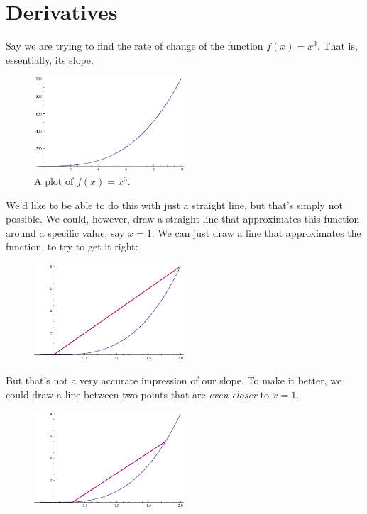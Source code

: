 \chapter{Derivatives}\label{ch:derivatives}

Say we are trying to find the rate of change of the function $f(x)=x^3$.
That is, essentially, its slope.
\begin{figure}[H]
  \begin{center}
    \includegraphics[width=0.5\textwidth]{continuous/derivatives/x3.eps}
  \end{center}
  \caption{A plot of $f(x)=x^3$.}
\end{figure}
We'd like to be able to do this with just a straight line, but that's simply not possible.
We could, however, draw a straight line that approximates this function around a specific value, say $x=1$.
We can just draw a line that approximates the function, to try to get it right:
\begin{figure}[H]
  \begin{center}
    \includegraphics[width=0.5\textwidth]{continuous/derivatives/x3_1.eps}
  \end{center}
\end{figure}
But that's not a very accurate impression of our slope.
To make it better, we could draw a line between two points that are \emph{even closer} to $x=1$.
\begin{figure}[H]
  \begin{center}
    \includegraphics[width=0.5\textwidth]{continuous/derivatives/x3_2.eps}
  \end{center}
\end{figure}
